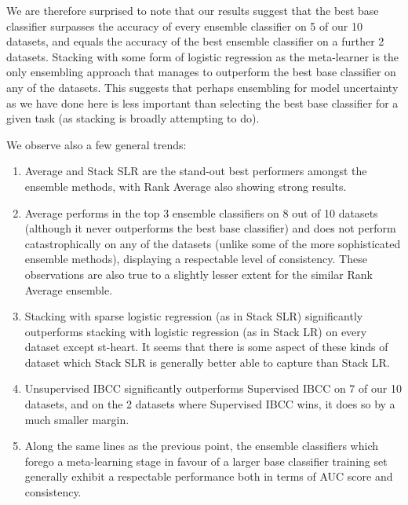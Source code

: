 \documentclass{bmcart}
\begin{document}
We are therefore surprised to note that our results suggest that the best base classifier surpasses the accuracy of every ensemble classifier on 5 of our 10 datasets, and equals the accuracy of the best ensemble classifier on a further 2 datasets. Stacking with some form of logistic regression as the meta-learner is the only ensembling approach that manages to outperform the best base classifier on any of the datasets. This suggests that perhaps ensembling for model uncertainty as we have done here is less important than selecting the best base classifier for a given task (as stacking is broadly attempting to do).

\noindent
We observe also a few general trends:

\begin{enumerate}
\item Average and Stack SLR are the stand-out best performers amongst the ensemble methods, with Rank Average also showing strong results.
\item Average performs in the top 3 ensemble classifiers on 8 out of 10 datasets (although it never outperforms the best base classifier) and does not perform catastrophically on any of the datasets (unlike some of the more sophisticated ensemble methods), displaying a respectable level of consistency. These observations are also true to a slightly lesser extent for the similar Rank Average ensemble.
\item Stacking with sparse logistic regression (as in Stack SLR) significantly outperforms stacking with logistic regression (as in Stack LR) on every dataset except st-heart. It seems that there is some aspect of these kinds of dataset which Stack SLR is generally better able to capture than Stack LR.
\item Unsupervised IBCC significantly outperforms Supervised IBCC on 7 of our 10 datasets, and on the 2 datasets where Supervised IBCC wins, it does so by a much smaller margin.
\item Along the same lines as the previous point, the ensemble classifiers which forego a meta-learning stage in favour of a larger base classifier training set generally exhibit a respectable performance both in terms of AUC score and consistency.
\end{enumerate}
\end{document}
